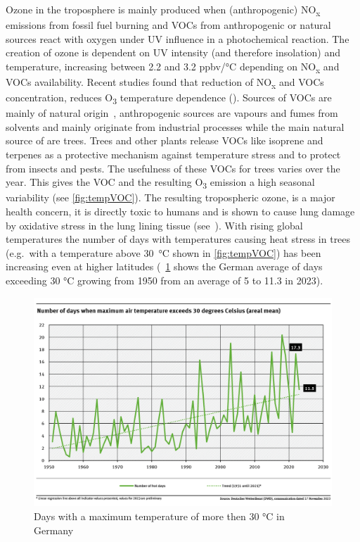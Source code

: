 \documentclass[12pt,a4paper, english,twoside]{scrartcl}
\begin{document}
      Ozone in the troposphere is mainly produced when (anthropogenic) NO\textsubscript{x} emissions from fossil fuel burning and \glspl{VOC} from anthropogenic or natural sources react with oxygen under UV influence in a photochemical reaction.
      The creation of ozone is dependent on UV intensity (and therefore insolation) and temperature, increasing between 2.2 and 3.2 ppbv/°C depending on NO\textsubscript{x} and \glspl{VOC} availability. 
      Recent studies found that reduction of NO\textsubscript{x} and \glspl{VOC} concentration, reduces O\textsubscript{3} temperature dependence (\cite{Otero2021}).
      Sources of \glspl{VOC} are mainly of natural origin~\autocite{Kansal2009}, anthropogenic sources are vapours and fumes from solvents and mainly originate from industrial processes while the main natural source of  are trees.
      Trees and other plants release VOCs like isoprene and terpenes as a protective mechanism against temperature stress and to protect from insects and pests. 
      The usefulness of these \glspl{VOC} for trees varies over the year.
      This gives the \gls{VOC} and the resulting O\textsubscript{3} emission a high seasonal variability (see \cref{fig:tempVOC}). 
      The resulting tropospheric ozone, is a major health concern, it is directly toxic to humans and is shown to cause lung damage by oxidative stress in the lung lining tissue (see~\cite{Mudway2000}). 
      With rising global temperatures the number of days with temperatures causing heat stress in trees (e.g.\ with a temperature above 30~°C shown in \cref{fig:tempVOC}) has been increasing even at higher latitudes (~\cref{fig:ubaTemps} shows the German average of days exceeding 30 °C growing from 1950 from an average of 5 to 11.3 in 2023).
      \begin{figure}[htbp]
       \begin{center}
         \includegraphics[width=\textwidth]{img/ubaTemp.png}
       \end{center}
       \caption{Days with a maximum temperature of more then 30 °C in Germany~\autocite[Reprinted from]{Wilke2023}\label{fig:ubaTemps}}
      \end{figure}
\end{document}
